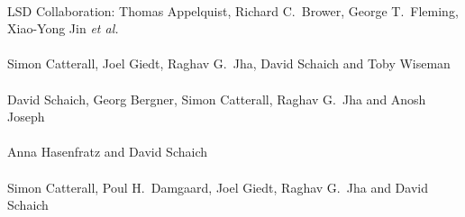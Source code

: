 \begin{spacelistout}
  \pagebreakitem
     \\
    LSD Collaboration: Thomas Appelquist, Richard C.~Brower, George T.~Fleming, Xiao-Yong Jin \textit{et al.} \\ %
  \pagebreakitem
     \\
    Simon Catterall, Joel Giedt, Raghav G.~Jha, David Schaich and Toby Wiseman \\
  \pagebreakitem
     \\
    David Schaich, Georg Bergner, Simon Catterall, Raghav G.~Jha and Anosh Joseph \\
  \pagebreakitem
     \\
    Anna Hasenfratz and David Schaich \\
  \pagebreakitem
     \\
    Simon Catterall, Poul H.~Damgaard, Joel Giedt, Raghav G.~Jha and David Schaich
\end{spacelistout}
